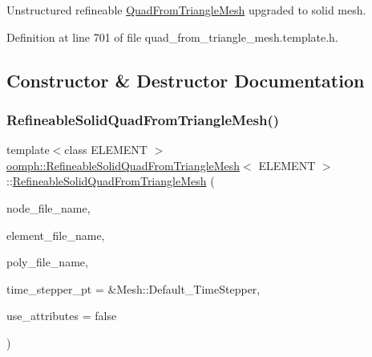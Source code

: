 Unstructured refineable \hyperlink{classoomph_1_1QuadFromTriangleMesh}{Quad\+From\+Triangle\+Mesh} upgraded to solid mesh. 

Definition at line 701 of file quad\+\_\+from\+\_\+triangle\+\_\+mesh.\+template.\+h.



\subsection{Constructor \& Destructor Documentation}
\mbox{\label{classoomph_1_1RefineableSolidQuadFromTriangleMesh_add069deb878fe3142334acac0c2d86af}} 
\subsubsection{\texorpdfstring{Refineable\+Solid\+Quad\+From\+Triangle\+Mesh()}{RefineableSolidQuadFromTriangleMesh()}\hspace{0.1cm}{\footnotesize\ttfamily [1/2]}}
{\footnotesize\ttfamily template$<$class E\+L\+E\+M\+E\+NT $>$ \\
\hyperlink{classoomph_1_1RefineableSolidQuadFromTriangleMesh}{oomph\+::\+Refineable\+Solid\+Quad\+From\+Triangle\+Mesh}$<$ E\+L\+E\+M\+E\+NT $>$\+::\hyperlink{classoomph_1_1RefineableSolidQuadFromTriangleMesh}{Refineable\+Solid\+Quad\+From\+Triangle\+Mesh} (\begin{DoxyParamCaption}\item[{const std\+::string \&}]{node\+\_\+file\+\_\+name,  }\item[{const std\+::string \&}]{element\+\_\+file\+\_\+name,  }\item[{const std\+::string \&}]{poly\+\_\+file\+\_\+name,  }\item[{Time\+Stepper $\ast$}]{time\+\_\+stepper\+\_\+pt = {\ttfamily \&Mesh\+:\+:Default\+\_\+TimeStepper},  }\item[{const bool \&}]{use\+\_\+attributes = {\ttfamily false} }\end{DoxyParamCaption})\hspace{0.3cm}{\ttfamily [inline]}}




